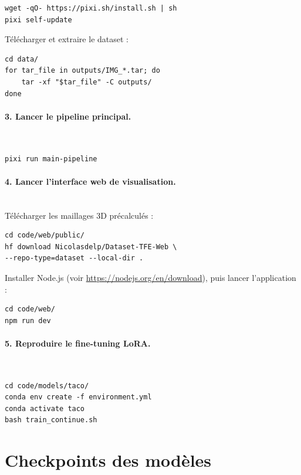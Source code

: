 \begin{lstlisting}[style=bash]
wget -qO- https://pixi.sh/install.sh | sh
pixi self-update
\end{lstlisting}

Télécharger et extraire le dataset :

\begin{lstlisting}[style=bash]
cd data/
for tar_file in outputs/IMG_*.tar; do
    tar -xf "$tar_file" -C outputs/
done
\end{lstlisting}

\paragraph{3. Lancer le pipeline principal.}~\\

\begin{lstlisting}[style=bash]
pixi run main-pipeline
\end{lstlisting}

\paragraph{4. Lancer l'interface web de visualisation.}~\\

Télécharger les maillages 3D précalculés :

\begin{lstlisting}[style=bash]
cd code/web/public/
hf download Nicolasdelp/Dataset-TFE-Web \
--repo-type=dataset --local-dir .
\end{lstlisting}

Installer Node.js (voir \url{https://nodejs.org/en/download}),
puis lancer l'application :

\begin{lstlisting}[style=bash]
cd code/web/
npm run dev
\end{lstlisting}

\paragraph{5. Reproduire le fine-tuning LoRA.}~\\

\begin{lstlisting}[style=bash]
cd code/models/taco/
conda env create -f environment.yml
conda activate taco
bash train_continue.sh
\end{lstlisting}

\section*{Checkpoints des modèles}

